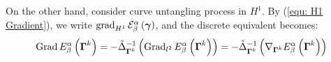 \documentclass[../dissertation.tex]{subfiles}
\begin{document}
On the other hand, consider curve untangling process in $H^1$.
By (\ref{equ: H1 Gradient}), we write $\operatorname{grad}_{H^1} \mathcal{E}_{\beta}^{\alpha} \left( \boldsymbol{\gamma} \right)$,
and the discrete equivalent becomes:
\begin{equation}
    \operatorname{Grad} E_{\beta}^{\alpha} \left( \boldsymbol{\Gamma}^k \right) = - \tilde{\Delta}^{-1}_{\boldsymbol{\Gamma}^k} \left( \operatorname{Grad}_{l^2} E_{\beta}^{\alpha} \left( \boldsymbol{\Gamma}^k \right) \right) = -\tilde{\Delta}^{-1}_{\boldsymbol{\Gamma}^k} \left( \nabla_{\boldsymbol{\Gamma}^k} E_{\beta}^{\alpha} \left( \boldsymbol{\Gamma}^k \right) \right)
\end{equation}


\end{document}
